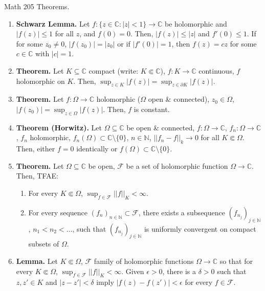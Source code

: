

\begin{center}
    Math 205 Theorems. 
\end{center}

\begin{enumerate}
    \item \textbf{Schwarz Lemma. } Let $f: \{z \in \mathbb{C}: |z| < 1\} \to \mathbb{C}$ be holomorphic and $|f(z)| \leq 1$ for all $z$, and $f(0)=0$. Then, $|f(z)| \leq |z|$ and $f'(0) \leq 1$. If for some $z_0 \neq 0$, $|f(z_0)| = |z_0|$ or if $|f'(0)| = 1$, then $f(z)=cz$ for some $c \in \mathbb{C}$ with $|c|=1$. 
    \item \textbf{Theorem. } Let $K \subseteq \mathbb{C}$ compact (write: $K \Subset \mathbb{C}$), $f: K \to \mathbb{C}$ continuous, $f$ holomorphic on $K$. Then, $\sup_{z \in K}|f(z)| = \sup_{z \in \partial K} |f(z)|$. 
    \item \textbf{Theorem. } Let $f: \Omega \to \mathbb{C}$ holomorphic ($\Omega$ open \& connected), $z_0 \in \Omega$, $|f(z_0)| = \sup_{z \in \Omega} |f(z)|$. Then, $f$ is constant. 
    \item \textbf{Theorem (Horwitz). } Let $\Omega \subseteq \mathbb{C}$ be open \& connected, $f: \Omega \to \mathbb{C}$, $f_n: \Omega \to \mathbb{C}$, $f_n$ holomorphic, $f_n(\Omega) \subset \mathbb{C} \setminus \{0\}$, $n \in \mathbb{N}$, $||f_n-f||_k \to 0$ for all $K \Subset \Omega$. Then, either $f=0$ identically or $f(\Omega) \subset \mathbb{C} \setminus \{0\}$. 
    \item \textbf{Theorem. } Let $\Omega \subseteq \mathbb{C}$ be open, $\mathscr{F}$ be a set of holomorphic function $\Omega \to \mathbb{C}$. Then, TFAE: 
    \begin{enumerate}
        \item For every $K \Subset \Omega$, $\sup_{f \in \mathscr{F}}||f||_K < \infty$. 
        \item For every sequence $(f_n)_{n \in \mathbb{N}} \subset \mathscr{F}$, there exists a subsequence $(f_{n_j})_{j \in \mathbb{N}}$, $n_1 < n_2 < \dots$, such that $(f_{n_j})_{j \in \mathbb{N}}$ is uniformly convergent on compact subsets of $\Omega$. 
    \end{enumerate}
    \item \textbf{Lemma. } Let $K \Subset \Omega$, $\mathscr{F}$ family of holomorphic functions $\Omega \to \mathbb{C}$ so that for every $K \Subset \Omega$, $\sup_{f \in \mathscr{F}} ||f||_K < \infty$. Given $\epsilon > 0$, there is a $\delta > 0$ such that $z,z'\in K$ and $|z-z'| < \delta$ imply $|f(z)-f(z')| < \epsilon$ for every $f \in \mathscr{F}$.

\end{enumerate}
